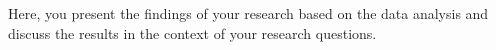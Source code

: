Here, you present the findings of your research based on the data analysis and discuss the results in the context of your research questions.

